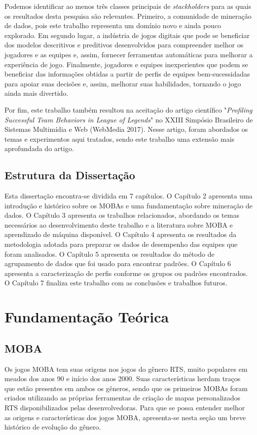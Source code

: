 Podemos identificar ao menos três classes principais de \textit{stackholders} para as quais os resultados desta pesquisa são relevantes. Primeiro, a comunidade de mineração de dados, pois este trabalho representa um domínio novo e ainda pouco explorado. Em segundo lugar, a indústria de jogos digitais que pode se beneficiar dos modelos descritivos e preditivos desenvolvidos para compreender melhor os jogadores e as equipes e, assim, fornecer ferramentas automáticas para melhorar a experiência de jogo. Finalmente, jogadores e equipes inexperientes que podem se beneficiar das informações obtidas a partir de perfis de equipes bem-sucessidadas para apoiar suas decisões e, assim, melhorar suas habilidades, tornando o jogo ainda mais divertido.

Por fim, este trabalho também resultou na aceitação do artigo científico "\textit{Profiling Successful Team Behaviors in League of Legends}" no XXIII Simpósio Brasileiro de Sistemas Multimídia e Web (WebMedia 2017). Nesse artigo, foram abordados os temas e experimentos aqui tratados, sendo este trabalho uma extensão mais aprofundada do artigo.

\section{Estrutura da Dissertação}
Esta dissertação encontra-se dividida em 7 capítulos. O Capítulo 2 apresenta uma introdução e histórico sobre os MOBAs e uma fundamentação sobre mineração de dados. O Capítulo 3 apresenta os trabalhos relacionados, abordando os temas necessários ao desenvolvimento deste trabalho e a literatura sobre MOBA e aprendizado de máquina disponível. O Capítulo 4 apresenta os resultados da metodologia adotada para preparar os dados de desempenho das equipes que foram analisados. O Capítulo 5 apresenta os resultados do método de agrupamento de dados que foi usado para encontrar padrões. O Capítulo 6 apresenta a caracterização de perfis conforme os grupos ou padrões encontrados. O Capítulo 7 finaliza este trabalho com as conclusões e trabalhos futuros.

\chapter{Fundamentação Teórica}

\section{MOBA}
Os jogos MOBA tem suas origens nos jogos do gênero RTS, muito populares em meados dos anos 90 e início dos anos 2000. Suas características herdam traços que estão presentes em ambos os gêneros, sendo que os primeiros MOBAs foram criados utilizando as próprias ferramentas de criação de mapas personalizados RTS disponibilizados pelas desenvolvedoras. Para que se possa entender melhor as origens e características dos jogos MOBA, apresenta-se nesta seção um breve histórico de evolução do gênero.

